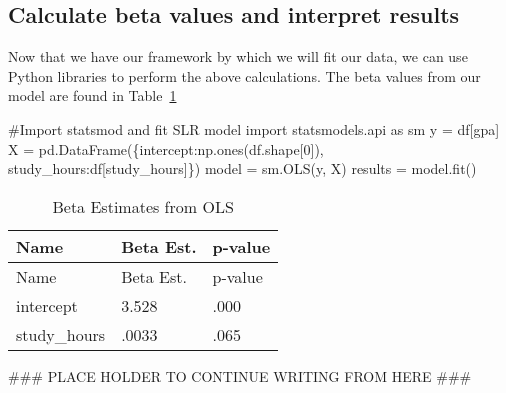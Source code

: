 \documentclass[
  letterpaper,
  DIV=11,
  numbers=noendperiod]{scrreprt}
\newenvironment{Shaded}{\begin{snugshade}}{\end{snugshade}}
\newcommand{\AlertTok}[1]{\textcolor[rgb]{0.68,0.00,0.00}{#1}}
\newcommand{\CommentTok}[1]{\textcolor[rgb]{0.37,0.37,0.37}{#1}}
\newcommand{\DecValTok}[1]{\textcolor[rgb]{0.68,0.00,0.00}{#1}}
\newcommand{\ImportTok}[1]{\textcolor[rgb]{0.00,0.46,0.62}{#1}}
\newcommand{\NormalTok}[1]{\textcolor[rgb]{0.00,0.23,0.31}{#1}}
\newcommand{\OperatorTok}[1]{\textcolor[rgb]{0.37,0.37,0.37}{#1}}
\newcommand{\StringTok}[1]{\textcolor[rgb]{0.13,0.47,0.30}{#1}}
\begin{document}
\hypertarget{calculate-beta-values-and-interpret-results}{%
\subsection{Calculate beta values and interpret
results}\label{calculate-beta-values-and-interpret-results}}

Now that we have our framework by which we will fit our data, we can use
Python libraries to perform the above calculations. The beta values from
our model are found in Table~\ref{tbl-beta-estimates}

\begin{Shaded}
\begin{Highlighting}[]
\CommentTok{\#Import statsmod and fit SLR model}
\ImportTok{import}\NormalTok{ statsmodels.api }\ImportTok{as}\NormalTok{ sm}
\NormalTok{y }\OperatorTok{=}\NormalTok{ df[}\StringTok{\textquotesingle{}gpa\textquotesingle{}}\NormalTok{]}
\NormalTok{X }\OperatorTok{=}\NormalTok{ pd.DataFrame(\{}\StringTok{\textquotesingle{}intercept\textquotesingle{}}\NormalTok{:np.ones(df.shape[}\DecValTok{0}\NormalTok{]), }\StringTok{\textquotesingle{}study\_hours\textquotesingle{}}\NormalTok{:df[}\StringTok{\textquotesingle{}study\_hours\textquotesingle{}}\NormalTok{]\})}
\NormalTok{model }\OperatorTok{=}\NormalTok{ sm.OLS(y, X)}
\NormalTok{results }\OperatorTok{=}\NormalTok{ model.fit()}
\end{Highlighting}
\end{Shaded}

\hypertarget{tbl-beta-estimates}{}
\begin{longtable}[]{@{}lll@{}}
\caption{\label{tbl-beta-estimates}Beta Estimates from
OLS}\tabularnewline
\toprule\noalign{}
Name & Beta Est. & p-value \\
\midrule\noalign{}
\endfirsthead
\toprule\noalign{}
Name & Beta Est. & p-value \\
\midrule\noalign{}
\endhead
\bottomrule\noalign{}
\endlastfoot
intercept & 3.528 & .000 \\
study\_hours & .0033 & .065 \\
\end{longtable}

\begin{Shaded}
\begin{Highlighting}[]
\CommentTok{\#\#\# PLACE HOLDER TO CONTINUE WRITING FROM HERE }\AlertTok{\#\#\#}
\end{Highlighting}
\end{Shaded}
\end{document}
